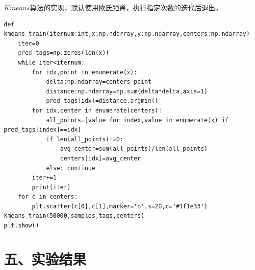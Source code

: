 \documentclass{article}
\begin{document}
\noindent $Kmeans$算法的实现，默认使用欧氏距离，执行指定次数的迭代后退出。
\begin{verbatim}
def kmeans_train(iternum:int,x:np.ndarray,y:np.ndarray,centers:np.ndarray):
    iter=0
    pred_tags=np.zeros(len(x))
    while iter<iternum:
        for idx,point in enumerate(x):
            delta:np.ndarray=centers-point
            distance:np.ndarray=np.sum(delta*delta,axis=1)
            pred_tags[idx]=distance.argmin()
        for idx,center in enumerate(centers):
            all_points=[value for index,value in enumerate(x) if pred_tags[index]==idx]
            if len(all_points)!=0:
                avg_center=sum(all_points)/len(all_points)
                centers[idx]=avg_center
            else: continue
        iter+=1
        print(iter)
    for c in centers:
        plt.scatter(c[0],c[1],marker='o',s=20,c='#1f1e33')
kmeans_train(50000,samples,tags,centers)
plt.show()
\end{verbatim}

\section*{\LARGE 五、实验结果}
\end{document}
